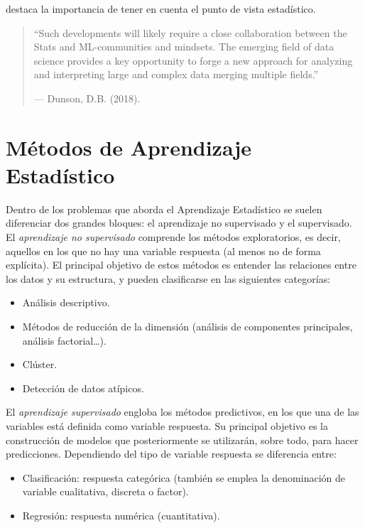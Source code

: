 \documentclass[
  spanish,
]{book}
\theoremstyle{break}
\theoremstyle{definition}
\theoremstyle{definition}
\theoremstyle{definition}
\theoremstyle{definition}
\theoremstyle{remark}
\begin{document}
destaca la importancia de tener en cuenta el punto de vista estadístico.

\begin{quote}
``Such developments will likely require a close collaboration between the Stats and ML-communities and mindsets.
The emerging field of data science provides a key opportunity to forge a new approach for analyzing and interpreting large and complex data merging multiple fields.''

--- Dunson, D.B. (2018).
\end{quote}

\hypertarget{muxe9todos-de-aprendizaje-estaduxedstico}{%
\section{Métodos de Aprendizaje Estadístico}\label{muxe9todos-de-aprendizaje-estaduxedstico}}

Dentro de los problemas que aborda el Aprendizaje Estadístico se suelen diferenciar dos grandes bloques: el aprendizaje no supervisado y el supervisado. El \emph{aprendizaje no supervisado} comprende los métodos exploratorios, es decir, aquellos en los que no hay una variable respuesta (al menos no de forma explícita). El principal objetivo de estos métodos es entender las relaciones entre los datos y su estructura, y pueden clasificarse en las siguientes categorías:

\begin{itemize}
\item
  Análisis descriptivo.
\item
  Métodos de reducción de la dimensión (análisis de componentes principales, análisis factorial\ldots).
\item
  Clúster.
\item
  Detección de datos atípicos.
\end{itemize}

El \emph{aprendizaje supervisado} engloba los métodos predictivos, en los que una de las variables está definida como variable respuesta. Su principal objetivo es la construcción de modelos que posteriormente se utilizarán, sobre todo, para hacer predicciones. Dependiendo del tipo de variable respuesta se diferencia entre:

\begin{itemize}
\item
  Clasificación: respuesta categórica (también se emplea la denominación de variable cualitativa, discreta o factor).
\item
  Regresión: respuesta numérica (cuantitativa).
\end{itemize}
\end{document}
